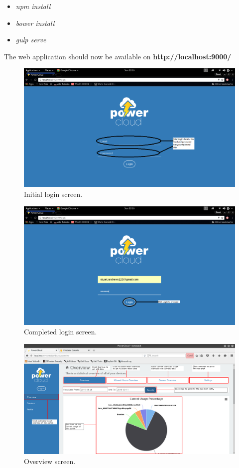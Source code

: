 \documentclass[a4paper,10pt]{article}
\begin{document}
	\begin{itemize}
		\item \textit{npm install}
		\item \textit{bower install}
		\item \textit{gulp serve}
	\end{itemize}
	
	The web application should now be available on \textbf{http://localhost:9000/}
	
	\begin{figure}[H]
		\includegraphics[width=\textwidth]{images/login.png}
		\caption{Initial login screen. \label{overflow}}
	\end{figure}
	
	\begin{figure}[H]
		\includegraphics[width=\textwidth]{images/login2.png}
		\caption{Completed login screen. \label{overflow}}
	\end{figure}
	
	\begin{figure}[H]
		\includegraphics[width=\textwidth]{images/Overview.png}
		\caption{Overview screen. \label{overflow}}
	\end{figure}
	
\end{document}
